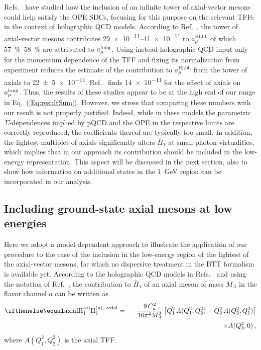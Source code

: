 Refs.~\cite{HolographyVienna, HolographyItaly} have studied how the inclusion of an infinite tower of axial-vector mesons could help satisfy the OPE SDCs, focusing for this purpose on the relevant TFFs in the context of holographic QCD models. According to Ref.~\cite{HolographyVienna}, the tower of axial-vector mesons contributes \SIrange[range-phrase = --,scientific-notation = fixed, range-units = brackets, fixed-exponent = -11]{29e-11}{41e-11}{\noop} to $a_\mu^\text{HLbL}$ of which \SIrange[range-phrase = --, range-units = brackets]{57}{58}{\percent} are attributed to $a_\mu^\text{long}$. Using instead holographic QCD input only for the momentum dependence of the TFF and fixing its normalization from experiment reduces the estimate of the contribution to $a_\mu^\text{HLbL}$ from the tower of axials to \num{22\pm5e-11}. Ref.~\cite{HolographyItaly} finds \num{14e-11} for the effect of axials on $a_\mu^\text{long}$. Thus, the results of these studies appear to be at the high end of our range in Eq.~(\ref{Eq:resultSum}). However, we stress that comparing these numbers with our result is not properly justified. Indeed, while in these models the parametric $\Sigma$-dependences implied by pQCD and the OPE in the respective limits are correctly reproduced, the coefficients thereof are typically too small. In addition, the lightest multiplet of axials significantly alters $\bar{\Pi}_1$ at small photon virtualities, which implies that in our approach its contribution should be included in the low-energy representation. This aspect will be discussed in the next section, also to show how information on additional states in the \SI{1}{\GeV} region can be incorporated in our analysis.


\subsection{Including ground-state axial mesons at low energies}
\label{Sec:NumAxials}
Here we adopt a model-dependent approach to illustrate the application of our procedure to the case of the inclusion in the low-energy region of the lightest of the axial-vector mesons, for which no dispersive treatment in the BTT formalism is available yet. According to the holographic QCD models in Refs.~\cite{HolographyVienna, HolographyItaly} and using the notation of Ref.~\cite{HolographyVienna}, the contribution to $\bar{\Pi}_1$ of an axial meson of mass $M_A$ in the flavor channel $a$ can be written as
\begin{eqnarray}
\PiPS[\text{axial}] & = & -\frac{9 \,C_a^2}{16\pi^4 M_A^2}\left[Q_1^2 \,A(Q_1^2, Q_2^2) + Q_2^2 \,A(Q_2^2, Q_1^2)\right]\nonumber\\
&&\times A(Q_3^2,0)\,,
\label{Eq:Axial}
\end{eqnarray}
where $A(Q_1^2, Q_2^2)$ is the axial TFF.

